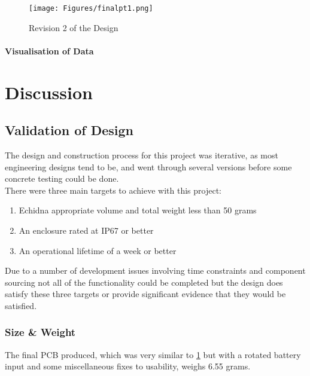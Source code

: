 \documentclass[12pt,openany,a4paper]{book}
\begin{document}
	
		\begin{figure}[H]
			\centering
			\texttt{[image: Figures/finalpt1.png]}
			\caption{Revision 2 of the Design}
			\label{fig:FIN}
		\end{figure}	
		
	\subsubsection{Visualisation of Data}
		
\chapter{Discussion}

	\section{Validation of Design}
		The design and construction process for this project was iterative, as most engineering designs tend to be, and went through several versions before some concrete testing could be done. \\
		
		There were three main targets to achieve with this project: \\
		\begin{enumerate}
			\item Echidna appropriate volume and total weight less than 50 grams
			\item An enclosure rated at IP67 or better
			\item An operational lifetime of a week or better
		\end{enumerate} 
		Due to a number of development issues involving time constraints and component sourcing not all of the functionality could be completed but the design does satisfy these three targets or provide significant evidence that they would be satisfied.\\
		
		\subsection{Size \& Weight}
		The final PCB produced, which was very similar to \ref{fig:FIN} but with a rotated battery input and some miscellaneous fixes to usability, weighs 6.55 grams.
		
\end{document}

